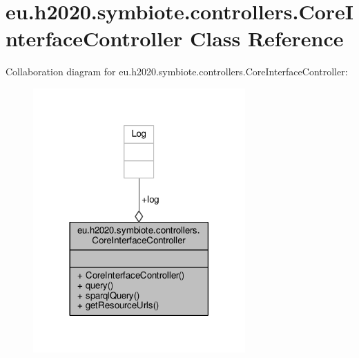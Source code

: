 \hypertarget{classeu_1_1h2020_1_1symbiote_1_1controllers_1_1CoreInterfaceController}{}\section{eu.\+h2020.\+symbiote.\+controllers.\+Core\+Interface\+Controller Class Reference}
\label{classeu_1_1h2020_1_1symbiote_1_1controllers_1_1CoreInterfaceController}


Collaboration diagram for eu.\+h2020.\+symbiote.\+controllers.\+Core\+Interface\+Controller\+:
\nopagebreak
\begin{figure}[H]
\begin{center}
\leavevmode
\includegraphics[width=230pt]{classeu_1_1h2020_1_1symbiote_1_1controllers_1_1CoreInterfaceController__coll__graph}
\end{center}
\end{figure}

